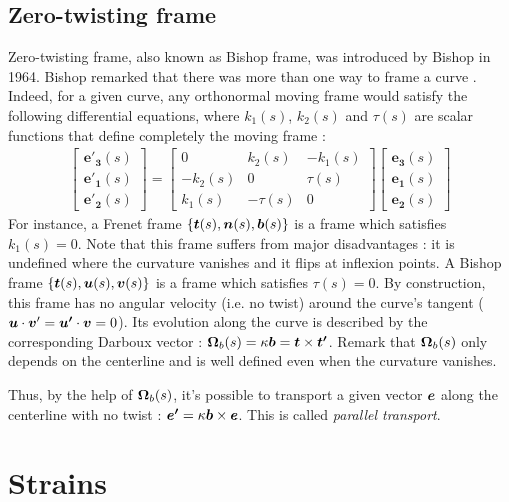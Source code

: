 \subsection{Zero-twisting frame}
Zero-twisting frame, also known as Bishop frame, was introduced by Bishop in 1964. Bishop remarked that there was more than one way to frame a curve \cite{Bishop1975}. Indeed, for a given curve, any orthonormal moving frame would satisfy the following differential equations, where $k_1(s)$, $k_2 (s)$ and $\tau(s)$ are scalar functions that define completely the moving frame :
\begin{gather}
	\begin{bmatrix}
		\mathbf{e'_{3}}(s) \\
		\mathbf{e'_{1}}(s) \\
		\mathbf{e'_{2}}(s)
	\end{bmatrix}
=
	\begin{bmatrix}
		0 & k_{2}(s) & -k_{1}(s) \\
		-k_{2}(s) & 0 & \tau(s) \\
		k_{1}(s) & -\tau(s) & 0
	\end{bmatrix}
	\begin{bmatrix}
		\mathbf{e_{3}}(s) \\
		\mathbf{e_{1}}(s) \\
		\mathbf{e_{2}}(s)
	\end{bmatrix}
\end{gather}
For instance, a Frenet frame $\{\boldsymbol{t}(s),\boldsymbol{n}(s),\boldsymbol{b}(s)\}$ is a frame which satisfies $k_1(s)=0$. Note that this frame suffers from major disadvantages : it is undefined where the curvature vanishes and it flips at inflexion points.
A Bishop frame $\{\boldsymbol{t}(s),\boldsymbol{u}(s),\boldsymbol{v}(s)\}$ is a frame which satisfies $\tau(s)=0$. By construction, this frame has no angular velocity (i.e. no twist) around the curve's tangent ($\boldsymbol{u}\cdot\boldsymbol{v}' = \boldsymbol{u'}\cdot\boldsymbol{v}=0$). Its evolution along the curve is described by the corresponding Darboux vector : $\boldsymbol{\Omega}_b(s)=\kappa\boldsymbol{b}=\boldsymbol{t}\times\boldsymbol{t'}$. Remark that $\boldsymbol{\Omega}_b(s)$ only depends on the centerline and is well defined even when the curvature vanishes.

Thus, by the help of $\boldsymbol{\Omega}_b(s)$, it's possible to transport a given vector $\boldsymbol{e}$ along the centerline with no twist : $\boldsymbol{e'}=\kappa\boldsymbol{b}\times\boldsymbol{e}$. This is called \emph{parallel transport}.

\section{Strains}

